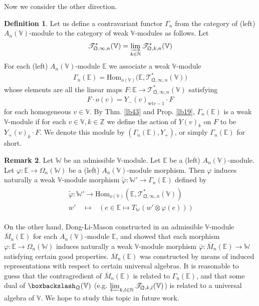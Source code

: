 \documentclass[11pt,b5paper,notitlepage]{article}
\theoremstyle{definition}
\newtheorem{df}{Definition}[subsection]
\newtheorem{rem}[df]{Remark}
\theoremstyle{plain}
\newcommand{\wtd}{\widetilde}
\newcommand{\ovl}{\overline}
\newcommand{\Hom}{\mathrm{Hom}}
\newcommand{\scr}{\mathscr}
\newcommand{\Vbb}{\mathbb V}
\newcommand{\Wbb}{\mathbb W}
\newcommand{\Nbb}{\mathbb N}
\newcommand{\Zbb}{\mathbb Z}
\newcommand{\Ebb}{\mathbb E}
\newcommand{\wt}{\mathrm{wt}}
\newcommand{\<}{\left\langle}
\renewcommand{\>}{\right\rangle}
\newcommand{\bbs}{\boxbackslash}
\newcommand{\fq}{{\mathfrak Q}}
\numberwithin{equation}{subsection}
\begin{document}
Now we consider the other direction. 
\begin{df}
Let us define a contravariant functor $\Gamma_n$ from the category of (left) $A_n(\Vbb)$-module to the category of weak $\Vbb$-modules as follows. Let
\begin{align*}
\scr T_{\fq,\infty,n}^*(\Vbb)=\varinjlim_{k\in\Nbb} \scr T_{\fq,k,n}^*(\Vbb)
\end{align*}
For each (left) $A_n(\Vbb)$-module $\Ebb$ we associate a weak $\Vbb$-module
\begin{align}
\Gamma_n(\Ebb)=\Hom_{o(\Vbb)}\big(\Ebb,\scr T_{\fq,\infty,n}^*(\Vbb)\big)
\end{align}
whose elements are all the linear maps $F:\Ebb\rightarrow\scr T_{\fq,\infty,n}^*(\Vbb)$ satisfying
\begin{align}
F \cdot o(v)=Y_-(v)_{\wt v-1}\cdot F
\end{align}
for each homogeneous $v\in\Vbb$. By Thm. \ref{lb43} and Prop. \ref{lb19}, $\Gamma_n(\Ebb)$ is a weak $\Vbb$-module if for each $v\in\Vbb,k\in\Zbb$ we define the action of $Y(v)_k$ on $F$ to be $Y_+(v)_k\cdot F$. We denote this module by $(\Gamma_n(\Ebb),Y_+)$, or simply $\Gamma_n(\Ebb)$ for short.
\end{df}

\begin{rem}
Let $\Wbb$ be an admissible $\Vbb$-module. Let $\Ebb$ be a (left) $A_n(\Vbb)$-module. Let $\varphi:\Ebb\rightarrow \Omega_n(\Wbb)$ be a (left) $A_n(\Vbb)$-module morphism. Then $\varphi$ induces naturally a weak $\Vbb$-module morphism $\wtd\varphi:\Wbb'\rightarrow\Gamma_n(\Ebb)$ defined by
\begin{gather}
\begin{gathered}
\wtd\varphi:\Wbb'\rightarrow \Hom_{o(\Vbb)}(\Ebb,\scr T_{\fq,\infty,n}^*(\Vbb))\\
w'\quad\mapsto\quad\big(~e\in\Ebb\mapsto T_\Wbb(w'\otimes \varphi(e))~\big)
\end{gathered}
\end{gather}

On the other hand, Dong-Li-Mason constructed in \cite{DLM-Zhu} an admissible $\Vbb$-module $\ovl M_n(\Ebb)$ for each $A_n(\Vbb)$-module $\Ebb$, and showed that each morphism $\varphi:\Ebb\rightarrow \Omega_n(\Wbb)$ induces naturally a weak $\Vbb$-module morphism $\ovl\varphi:\ovl M_n(\Ebb)\rightarrow\Wbb$ satisfying certain good properties. $\ovl M_n(\Ebb)$ was constructed by means of induced representations with respect to certain universal algebras. It is reasonable to guess that the contragredient of $\ovl M_n(\Ebb)$ is related to $\Gamma_n(\Ebb)$, and that some dual of $\bbs_\fq(\Vbb)$ (e.g. $\varprojlim_{k,l\in\Nbb}\scr T_{\fq,k,l}(\Vbb)$) is related to a universal algebra of $\Vbb$. We hope to study this topic in future work.
\end{rem}
\end{document}
